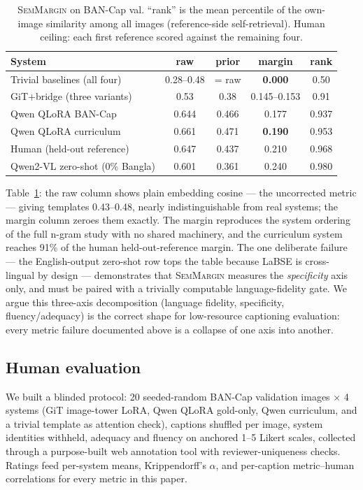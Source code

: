 \documentclass[11pt]{article}
\newcommand{\semmargin}{\textsc{SemMargin}}
\begin{document}
\begin{table}[t]
\centering
\caption{\semmargin{} on BAN-Cap val. ``rank'' is the mean percentile
of the own-image similarity among all images (reference-side
self-retrieval). Human ceiling: each first reference scored against
the remaining four.}
\label{tab:semmargin}
\small
\begin{tabular}{lcccc}
\toprule
System & raw & prior & margin & rank \\
\midrule
Trivial baselines (all four) & 0.28--0.48 & = raw & \textbf{0.000} & 0.50 \\
GiT+bridge (three variants) & 0.53 & 0.38 & 0.145--0.153 & 0.91 \\
Qwen QLoRA BAN-Cap & 0.644 & 0.466 & 0.177 & 0.937 \\
Qwen QLoRA curriculum & 0.661 & 0.471 & \textbf{0.190} & 0.953 \\
Human (held-out reference) & 0.647 & 0.437 & 0.210 & 0.968 \\
Qwen2-VL zero-shot (0\% Bangla) & 0.601 & 0.361 & 0.240 & 0.980 \\
\bottomrule
\end{tabular}
\end{table}

Table~\ref{tab:semmargin}: the raw column shows plain embedding cosine
--- the uncorrected metric --- giving templates 0.43--0.48, nearly
indistinguishable from real systems; the margin column zeroes them
exactly. The margin reproduces the system ordering of the full n-gram
study with no shared machinery, and the curriculum system reaches 91\%
of the human held-out-reference margin. The one deliberate failure ---
the English-output zero-shot row tops the table because LaBSE is
cross-lingual by design --- demonstrates that \semmargin{} measures
the \emph{specificity} axis only, and must be paired with a trivially
computable language-fidelity gate. We argue this three-axis
decomposition (language fidelity, specificity, fluency/adequacy) is
the correct shape for low-resource captioning evaluation: every metric
failure documented above is a collapse of one axis into another.

\subsection{Human evaluation}

We built a blinded protocol: 20 seeded-random BAN-Cap validation
images $\times$ 4 systems (GiT image-tower LoRA, Qwen QLoRA gold-only,
Qwen curriculum, and a trivial template as attention check), captions
shuffled per image, system identities withheld, adequacy and fluency
on anchored 1--5 Likert scales, collected through a purpose-built web
annotation tool with reviewer-uniqueness checks. Ratings feed
per-system means, Krippendorff's $\alpha$, and per-caption
metric--human correlations for every metric in this paper.
\end{document}
